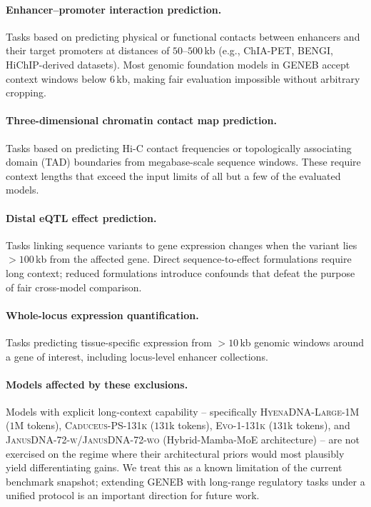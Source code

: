 \documentclass{llmxive}
\begin{document}
\paragraph{Enhancer--promoter interaction prediction.} Tasks based on
predicting physical or functional contacts between enhancers and
their target promoters at distances of $50$--$500$\,kb (e.g.,
ChIA-PET, BENGI, HiChIP-derived datasets). Most genomic foundation
models in GENEB accept context windows below $6$\,kb, making fair
evaluation impossible without arbitrary cropping.

\paragraph{Three-dimensional chromatin contact map prediction.} Tasks
based on predicting Hi-C contact frequencies or topologically
associating domain (TAD) boundaries from megabase-scale sequence
windows. These require context lengths that exceed the input limits
of all but a few of the evaluated models.

\paragraph{Distal eQTL effect prediction.} Tasks linking sequence
variants to gene expression changes when the variant lies $>100$\,kb
from the affected gene. Direct sequence-to-effect formulations
require long context; reduced formulations introduce confounds that
defeat the purpose of fair cross-model comparison.

\paragraph{Whole-locus expression quantification.} Tasks predicting
tissue-specific expression from $>10$\,kb genomic windows around a
gene of interest, including locus-level enhancer collections.

\paragraph{Models affected by these exclusions.} Models with
explicit long-context capability -- specifically
\textsc{HyenaDNA-Large-1M} ($1$M tokens),
\textsc{Caduceus-PS-131k} ($131$k tokens),
\textsc{Evo-1-131k} ($131$k tokens), and
\textsc{JanusDNA-72-w}/\textsc{JanusDNA-72-wo} (Hybrid-Mamba-MoE
architecture) -- are not exercised on the regime where their architectural
priors would most plausibly yield differentiating gains. We treat
this as a known limitation of the current benchmark snapshot;
extending GENEB with long-range regulatory tasks under a unified
protocol is an important direction for future work.
\end{document}
